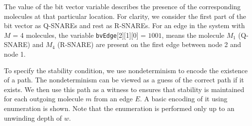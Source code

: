 %
%
%
%
%
% 
%
%
%
%
%
%
%
%
%
The value of the bit vector variable describes the presence of the corresponding molecules at that particular location. 
%
For clarity, we consider the first part of the bit vector as Q-SNAREs and rest as R-SNAREs.
%
For an edge in the system with $M$ = 4 molecules, the variable \texttt{bvEdge}[2][1][0] = $1001$, means the molecule  $M_{1}$ (Q-SNARE) and $M_{4}$ (R-SNARE) are present on the first edge between node 2 and node 1.

To specify the stability condition, we use nondeterminism to encode the existence of a path. 
%
The nondeterminism can be viewed as a guess of the correct path if it exists. 
%
We then use this path as a witness to ensures that stability is maintained for each outgoing molecule $m$ from an edge $E$.
%
A basic encoding of it using enumeration is shown.
%
%
%
Note that the enumeration is performed only up to an unwinding depth of $w$.
%
